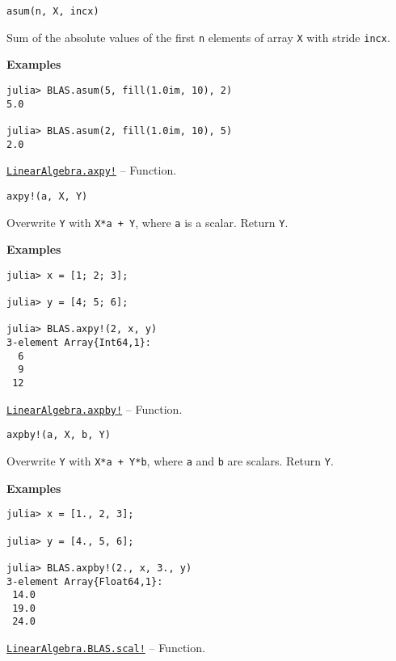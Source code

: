 \begin{adjustwidth}{2em}{0pt}


\begin{verbatim}
asum(n, X, incx)
\end{verbatim}

Sum of the absolute values of the first \texttt{n} elements of array \texttt{X} with stride \texttt{incx}.

\textbf{Examples}


\begin{verbatim}
julia> BLAS.asum(5, fill(1.0im, 10), 2)
5.0

julia> BLAS.asum(2, fill(1.0im, 10), 5)
2.0
\end{verbatim}



\end{adjustwidth}
\hypertarget{1249554703870980233}{} 
\hyperlink{1249554703870980233}{\texttt{LinearAlgebra.axpy!}}  -- {Function.}

\begin{adjustwidth}{2em}{0pt}


\begin{verbatim}
axpy!(a, X, Y)
\end{verbatim}

Overwrite \texttt{Y} with \texttt{X*a + Y}, where \texttt{a} is a scalar. Return \texttt{Y}.

\textbf{Examples}


\begin{verbatim}
julia> x = [1; 2; 3];

julia> y = [4; 5; 6];

julia> BLAS.axpy!(2, x, y)
3-element Array{Int64,1}:
  6
  9
 12
\end{verbatim}



\end{adjustwidth}
\hypertarget{15769382652026820442}{} 
\hyperlink{15769382652026820442}{\texttt{LinearAlgebra.axpby!}}  -- {Function.}

\begin{adjustwidth}{2em}{0pt}


\begin{verbatim}
axpby!(a, X, b, Y)
\end{verbatim}

Overwrite \texttt{Y} with \texttt{X*a + Y*b}, where \texttt{a} and \texttt{b} are scalars. Return \texttt{Y}.

\textbf{Examples}


\begin{verbatim}
julia> x = [1., 2, 3];

julia> y = [4., 5, 6];

julia> BLAS.axpby!(2., x, 3., y)
3-element Array{Float64,1}:
 14.0
 19.0
 24.0
\end{verbatim}



\end{adjustwidth}
\hypertarget{1309689219983162396}{} 
\hyperlink{1309689219983162396}{\texttt{LinearAlgebra.BLAS.scal!}}  -- {Function.}

